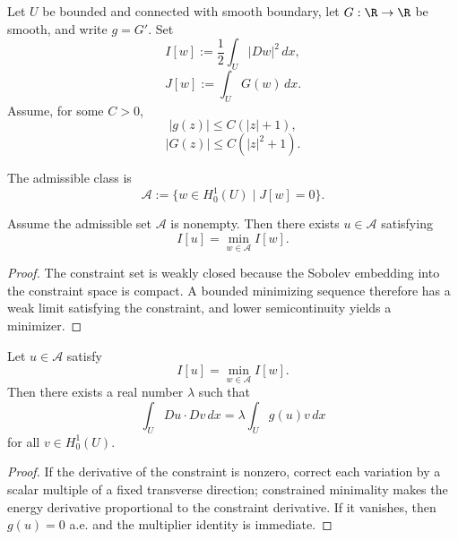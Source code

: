Let $U$ be bounded and connected with smooth boundary, let $G:\R\to\R$ be smooth, and write $g=G'$. Set
\[
I[w]:=\frac12\int_U|Dw|^2\,dx,
\tag{1}
\]
\[
J[w]:=\int_UG(w)\,dx.
\tag{2}
\]
Assume, for some $C>0$,
\[
|g(z)|\leq C(|z|+1),
\tag{3}
\]
\[
|G(z)|\leq C(|z|^2+1).
\tag{4}
\]

\begin{definition}
\label{def:admissible-class-nonlinear-eigenvalue}
The admissible class is
\[
\mathcal{A} := \{w \in H_0^1(U) \mid J[w] = 0\}.
\]
\end{definition}

\begin{theorem}
\label{thm:existence-constrained-minimizer-nonlinear-eigenvalue}
Assume the admissible set $\mathcal{A}$ is nonempty. Then there exists $u \in \mathcal{A}$ satisfying
\[
I[u] = \min_{w \in \mathcal{A}} I[w].
\]
\end{theorem}

\begin{proof}
\sketch The constraint set is weakly closed because the Sobolev embedding into the constraint space is compact. A bounded minimizing sequence therefore has a weak limit satisfying the constraint, and lower semicontinuity yields a minimizer.
\end{proof}

\begin{theorem}
\label{thm:lagrange-multiplier-nonlinear-eigenvalue}
Let $u \in \mathcal{A}$ satisfy
\[
I[u] = \min_{w \in \mathcal{A}} I[w].
\tag{9}
\]
Then there exists a real number $\lambda$ such that
\[
\int_U Du \cdot Dv\, dx = \lambda \int_U g(u)v\, dx
\tag{10}
\]
for all $v \in H_0^1(U)$.
\end{theorem}

\begin{proof}
\sketch If the derivative of the constraint is nonzero, correct each variation by a scalar multiple of a fixed transverse direction; constrained minimality makes the energy derivative proportional to the constraint derivative. If it vanishes, then $g(u)=0$ a.e. and the multiplier identity is immediate.
\end{proof}

